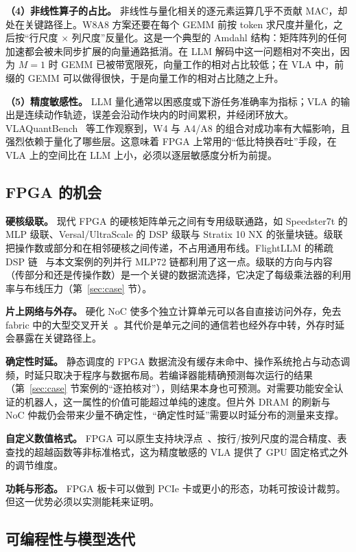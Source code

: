\documentclass[a4paper,10.5pt]{ctexart}
\begin{document}
\textbf{（4）非线性算子的占比。} 非线性与量化相关的逐元素运算几乎不贡献 MAC，却处在关键路径上。W8A8 方案还要在每个 GEMM 前按 token 求尺度并量化，之后按“行尺度 $\times$ 列尺度”反量化。这是一个典型的 Amdahl 结构：矩阵阵列的任何加速都会被未同步扩展的向量通路抵消。在 LLM 解码中这一问题相对不突出，因为 $M=1$ 时 GEMM 已被带宽限死，向量工作的相对占比较低；在 VLA 中，前缀的 GEMM 可以做得很快，于是向量工作的相对占比随之上升。

\textbf{（5）精度敏感性。} LLM 量化通常以困惑度或下游任务准确率为指标；VLA 的输出是连续动作轨迹，误差会沿动作块内的时间累积，并经闭环放大。VLAQuantBench~\cite{vlaquantbench} 等工作观察到，W4 与 A4/A8 的组合对成功率有大幅影响，且强烈依赖于量化了哪些层。这意味着 FPGA 上常用的“低比特换吞吐”手段，在 VLA 上的空间比在 LLM 上小，必须以逐层敏感度分析为前提。

\subsection{FPGA 的机会}

\textbf{硬核级联。} 现代 FPGA 的硬核矩阵单元之间有专用级联通路，如 Speedster7t 的 MLP 级联、Versal/UltraScale 的 DSP 级联与 Stratix 10 NX 的张量块链。级联把操作数或部分和在相邻硬核之间传递，不占用通用布线。FlightLLM 的稀疏 DSP 链~\cite{flightllm} 与本文案例的列并行 MLP72 链都利用了这一点。级联的方向与内容（传部分和还是传操作数）是一个关键的数据流选择，它决定了每级乘法器的利用率与布线压力（第~\ref{sec:case} 节）。

\textbf{片上网络与外存。} 硬化 NoC 使多个独立计算单元可以各自直接访问外存，免去 fabric 中的大型交叉开关~\cite{achronix,versal_fpga19}。其代价是单元之间的通信若也经外存中转，外存时延会暴露在关键路径上。

\textbf{确定性时延。} 静态调度的 FPGA 数据流没有缓存未命中、操作系统抢占与动态调频，时延只取决于程序与数据布局。若编译器能精确预测每次运行的结果（第~\ref{sec:case} 节案例的“逐拍核对”），则结果本身也可预测。对需要功能安全认证的机器人，这一属性的价值可能超过单纯的速度。但片外 DRAM 的刷新与 NoC 仲裁仍会带来少量不确定性，“确定性时延”需要以时延分布的测量来支撑。

\textbf{自定义数值格式。} FPGA 可以原生支持块浮点~\cite{msfp,mx}、按行/按列尺度的混合精度、表查找的超越函数等非标准格式，这为精度敏感的 VLA 提供了 GPU 固定格式之外的调节维度。

\textbf{功耗与形态。} FPGA 板卡可以做到 PCIe 卡或更小的形态，功耗可按设计裁剪。但这一优势必须以实测能耗来证明。

\subsection{可编程性与模型迭代}
\end{document}
